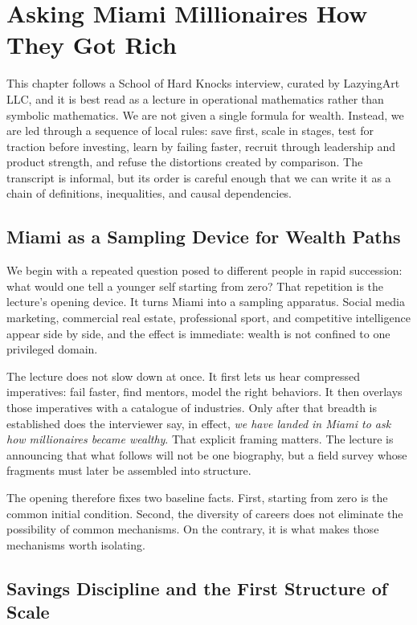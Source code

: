 \chapter{Asking Miami Millionaires How They Got Rich}

This chapter follows a School of Hard Knocks interview, curated by LazyingArt LLC, and it is best read as a lecture in operational mathematics rather than symbolic mathematics. We are not given a single formula for wealth. Instead, we are led through a sequence of local rules: save first, scale in stages, test for traction before investing, learn by failing faster, recruit through leadership and product strength, and refuse the distortions created by comparison. The transcript is informal, but its order is careful enough that we can write it as a chain of definitions, inequalities, and causal dependencies.

\section{Miami as a Sampling Device for Wealth Paths}

We begin with a repeated question posed to different people in rapid succession: what would one tell a younger self starting from zero? That repetition is the lecture's opening device. It turns Miami into a sampling apparatus. Social media marketing, commercial real estate, professional sport, and competitive intelligence appear side by side, and the effect is immediate: wealth is not confined to one privileged domain.

The lecture does not slow down at once. It first lets us hear compressed imperatives: fail faster, find mentors, model the right behaviors. It then overlays those imperatives with a catalogue of industries. Only after that breadth is established does the interviewer say, in effect, \emph{we have landed in Miami to ask how millionaires became wealthy}. That explicit framing matters. The lecture is announcing that what follows will not be one biography, but a field survey whose fragments must later be assembled into structure.

The opening therefore fixes two baseline facts. First, starting from zero is the common initial condition. Second, the diversity of careers does not eliminate the possibility of common mechanisms. On the contrary, it is what makes those mechanisms worth isolating.

\section{Savings Discipline and the First Structure of Scale}

